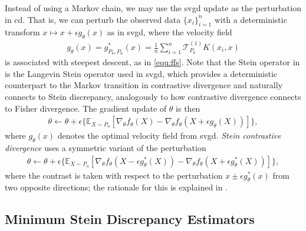 \documentclass[12pt,paper=letter]{scrreprt}
\def\mbb#1{\mathbb{#1}}
\def\E{\mbb{E}} %
\newcommand{\vtheta}{\theta}
\begin{document}
Instead of using a Markov chain, we may use the \ac{svgd} update as the perturbation in \ac{cd}. 
That is, we can perturb the observed data $\{x_i\}_{i=1}^n$ with a deterministic transform $ x \mapsto x + \epsilon g_\theta(x)$ as in \ac{svgd}, 
where the velocity field
\begin{align}
    g_\theta(x) = g_{P_\theta,P_n}^*(x) = \frac{1}{n} \sum_{i=1}^n \mathcal{T}_{P_\theta}^{(1)} K(x_i,x) \label{eq: CD optimal}
\end{align}
is associated with steepest descent, as in \eqref{equ:ffs}.
Note that the Stein operator in  is the Langevin Stein operator used in \ac{svgd}, which provides a deterministic counterpart to the Markov transition in contrastive divergence and naturally connects to Stein discrepancy, analogously to how contrastive divergence connects to Fisher divergence.
The gradient update of $\theta$ is then
\begin{align}\label{equ:steincd}
\vtheta \gets \vtheta + \epsilon \{ \E_{X \sim P_n} [\nabla_\vtheta f_\theta (X)  -  \nabla_\vtheta f_\theta (X + \epsilon g_\theta(X)) ] \}, 
\end{align}
where $g_\theta(x)$ denotes the optimal velocity field from \ac{svgd}. 
\emph{Stein contrastive divergence}  \citep{liu2017learning} 
uses a symmetric variant of the perturbation  
\begin{align}\label{equ:steincd_adv}
\theta \gets \theta + \epsilon \{ \E_{X \sim P_n}[\nabla_\theta f_\theta(X - \epsilon g_\theta^*(X)) - \nabla_\theta f_\theta(X + \epsilon g_\theta^*(X))] \} ,
\end{align}
where the contrast is taken with respect to the perturbation $x \pm \epsilon g_\theta^*(x)$ from two opposite directions; the rationale for this is explained in .






\subsection{Minimum Stein Discrepancy Estimators}
\label{subsec: MSDE}
\end{document}
